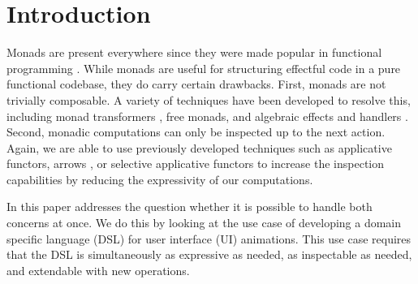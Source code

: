 \section{Introduction}
\label{sec:intro}

Monads are present everywhere since they were made popular in functional programming \cite{DBLP:conf/lfp/Wadler90}. While monads are useful for structuring effectful code in a pure functional codebase, they do carry certain drawbacks. First, monads are not trivially composable. A variety of techniques have been developed to resolve this, including monad transformers \cite{DBLP:conf/popl/LiangHJ95}, free monads, and algebraic effects and handlers \cite{DBLP:conf/esop/PlotkinP09}. Second, monadic computations can only be inspected up to the next action. Again, we are able to use previously developed techniques such as applicative functors, arrows \cite{DBLP:journals/scp/Hughes00}, or selective applicative functors to increase the inspection capabilities by reducing the expressivity of our computations.

In this paper addresses the question whether it is possible to handle both concerns at once. We do this by looking at the use case of developing a domain specific language (DSL) for user interface (UI) animations. This use case requires that the DSL is simultaneously as expressive as needed, as inspectable as needed, and extendable with new operations.
